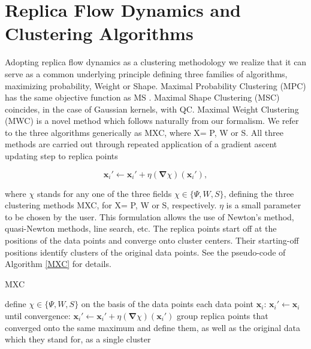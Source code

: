 \documentclass[preprint,12pt]{elsarticle}
\begin{document}
\section{Replica Flow Dynamics and Clustering Algorithms}
\label{replica}
Adopting replica flow dynamics as a clustering methodology we realize that it can serve as a common underlying principle defining three families of algorithms, maximizing probability, Weight or Shape. Maximal Probability Clustering (MPC) has the same objective function as MS \cite{cheng1995}. Maximal Shape Clustering (MSC) coincides, in the case of Gaussian kernels, with QC. Maximal Weight Clustering (MWC) is a novel method which follows naturally from our formalism. We refer to the three algorithms generically as MXC, where X= P, W or S. All three methods are carried out through repeated application of a gradient ascent updating step to replica points

\begin{equation}\label{gradient_descent_step}
  \mathbf{x}_i' \gets \mathbf{x}_i'+\eta\left(\boldsymbol{\nabla}\chi\right)\left(\mathbf{x}_i'\right),
\end{equation}

where $\chi$ stands for any one of the three fields $\chi \in \{\Psi,W,S\}$, defining the three clustering methods MXC, for X= P, W or S, respectively. $\eta$ is a small parameter to be chosen by the user. This formulation allows the use of Newton's method, quasi-Newton methods, line search, etc. The replica points start off at the positions of the data points and converge onto cluster centers. Their starting-off positions identify clusters of the original data points. See the pseudo-code of Algorithm \ref{MXC} for details.

\begin{algorithm}
\caption{MXC}\label{MXC}
\begin{algorithmic}[1]
\State define $\chi\in \{\Psi,W,S\}$ on the basis of the data points
\MFor each data point $\mathbf{x}_i$:
	\State $\mathbf{x}_i' \gets \mathbf{x}_i$
	\MRepeat until convergence:
		\State $\mathbf{x}_i' \gets \mathbf{x}_i'+\eta\left(\boldsymbol{\nabla}\chi\right)\left(\mathbf{x}_i'\right)$  
	\EndMRepeat
\EndMFor
\State group replica points that converged onto the same maximum and define them, as well as the original data which they stand for, as a single cluster
\end{algorithmic}
\end{algorithm}
\end{document}
